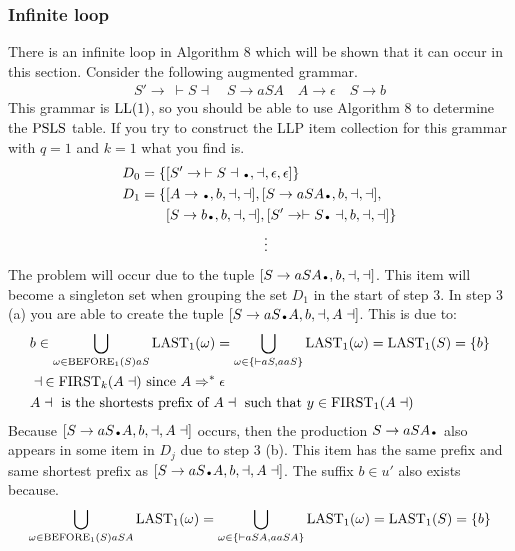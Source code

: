 \subsubsection{Infinite loop}
There is an infinite loop in Algorithm 8 \cite[13]{Vagner2007} which will be shown that it can occur in this section. Consider the following augmented grammar.
\begin{align*}
    S' \to \: \vdash S \dashv \quad S \to aSA \quad A \to \epsilon \quad S \to b
\end{align*}
This grammar is $\text{LL}(1)$, so you should be able to use Algorithm 8 to determine the $\text{PSLS}$ table. If you try to construct the LLP item collection for this grammar with $q = 1$ and $k = 1$ what you find is.
\begin{align*}
    D_0 = \{& [S' \to \: \vdash S \dashv\bigdot, \dashv, \epsilon, \epsilon]\} \\
    D_1 = \{& [A \to \bigdot , b, \dashv, \dashv], [S \to a S A\bigdot , b, \dashv, \dashv], \\
    & [S \to b\bigdot , b, \dashv, \dashv],[S' \to \vdash S\bigdot \dashv, b, \dashv, \dashv]\} \\
    & \qquad\qquad\qquad\quad \vdots
\end{align*}
The problem will occur due to the tuple $[S \to a S A\bigdot , b, \dashv, \dashv]$. This item will become a singleton set when grouping the set $D_1$ in the start of step 3. In step 3 (a) you are able to create the tuple $[S \to a S\bigdot A, b, \dashv, A \dashv]$. This is due to:
\begin{align*}
    & b \in \bigcup_{\omega \in \text{BEFORE}_1(S) aS} \text{LAST}_1(\omega) = \bigcup_{\omega \in \{\vdash aS, aaS\}} \text{LAST}_1(\omega) = \text{LAST}_1(S) = \{b\} \\
    & \dashv \: \in \text{FIRST}_k(A\dashv) \text{ since } A \Rightarrow^* \epsilon \\
    & A\dashv \text{ is the shortests prefix of } A\dashv \text{ such that } y \in \text{FIRST}_1(A\dashv)
\end{align*}
Because $[S \to a S\bigdot A, b, \dashv, A \dashv]$ occurs, then the production $S \to a S A\bigdot$ also appears in some item in $D_j$ due to step 3 (b). This item has the same prefix and same shortest prefix as $[S \to a S\bigdot A, b, \dashv, A \dashv]$. The suffix $b \in u'$ also exists because. 
\begin{align*}
    \bigcup_{\omega \in \text{BEFORE}_1(S) aSA} \text{LAST}_1(\omega) = \bigcup_{\omega \in \{\vdash aSA, aaSA\}} \text{LAST}_1(\omega) = \text{LAST}_1(S) = \{b\}
\end{align*}
